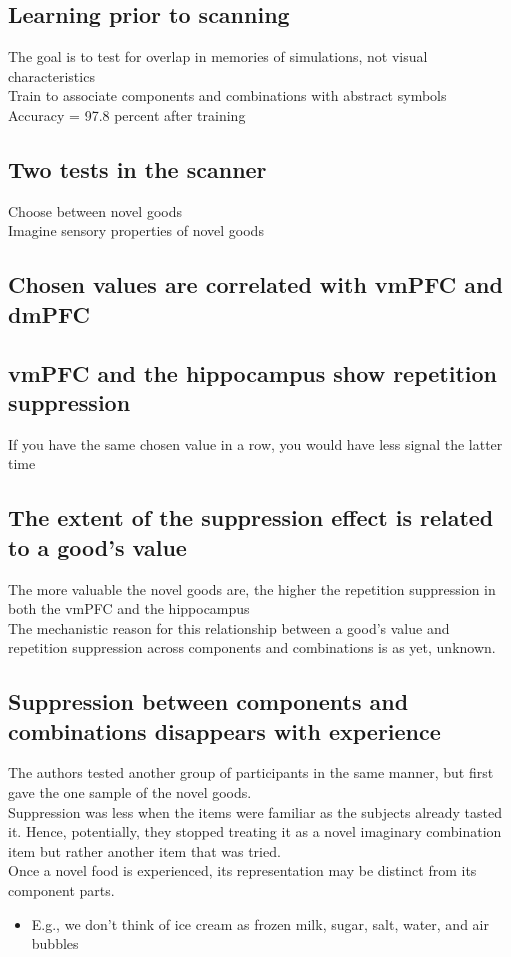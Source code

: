 \subsection{Learning prior to scanning}
The goal is to test for overlap in memories of simulations, not visual characteristics
\\Train to associate components and combinations with abstract symbols
\\Accuracy = 97.8 percent after training
\subsection{Two tests in the scanner}
Choose between novel goods
\\Imagine sensory properties of novel goods

\subsection{Chosen values are correlated with vmPFC and dmPFC}
\subsection{vmPFC and the 
hippocampus show repetition suppression}
If you have the same chosen value in a row, you would have less signal the latter time
\subsection{The extent of the suppression effect is related to a good's value}
The more valuable the novel goods are, the higher the repetition suppression in both the vmPFC and the hippocampus
\\The mechanistic reason for this relationship between a good's value and repetition suppression across components and combinations is as yet, unknown.
\subsection{Suppression between components and combinations disappears with experience}
The authors tested another group of participants in the same manner, but first gave the one sample of the novel goods.
\\Suppression was less when the items were familiar as the subjects already tasted it. Hence, potentially, they stopped treating it as a novel imaginary combination item but rather another item that was tried.
\\Once a novel food is experienced, its representation may be distinct from its component parts.
\begin{itemize}
    \item E.g., we don't think of ice cream as frozen milk, sugar, salt, water, and air bubbles
\end{itemize}

